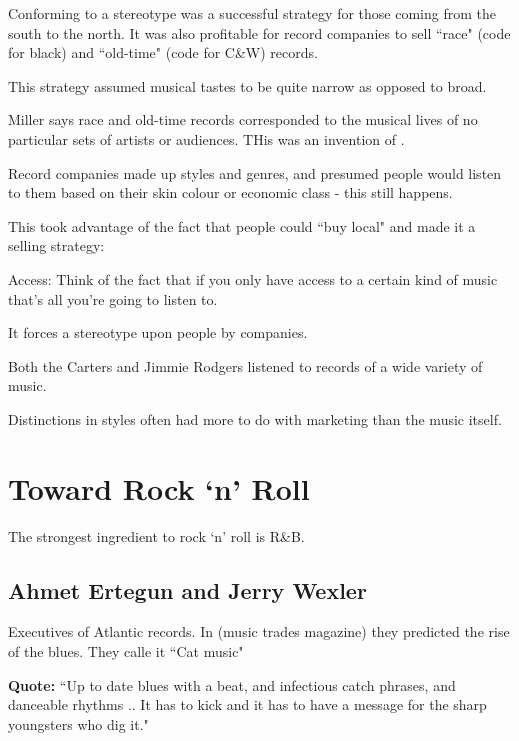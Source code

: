 \documentclass[12pt, a4paper, twoside, openright, titlepage]{book}
\begin{document}
Conforming to a stereotype was a successful strategy for those coming from the south to the north. It was also profitable for record companies to sell ``race" (code for black) and ``old-time" (code for C\&W) records.


This strategy assumed musical tastes to be quite narrow as opposed to broad.

\begin{note}{}{}
    Miller says race and old-time records corresponded to the musical lives of no particular sets of artists or audiences. THis was an invention of .
\end{note}

Record companies made up styles and genres, and presumed people would listen to them based on their skin colour or economic class - this still happens.


This took advantage of the fact that people could ``buy local" and made it a selling strategy:

\begin{note}{}{}
    Access: Think of the fact that if you only have access to a certain kind of music that's all you're going to listen to. 

    It forces a stereotype upon people by companies.
\end{note}

\begin{rmk}{}{}
    Both the Carters and Jimmie Rodgers listened to records of a wide variety of music.
\end{rmk}

Distinctions in styles often had more to do with marketing than the music itself.

\section{Toward Rock `n' Roll}

The strongest ingredient to rock `n' roll is R\&B.


\subsection{Ahmet Ertegun and Jerry Wexler}

Executives of Atlantic records. In  (music trades magazine) they predicted the rise of the blues. They calle it ``Cat music"

\textbf{Quote:} ``Up to date blues with a beat, and infectious catch phrases, and danceable rhythms .. It has to kick and it has to have a message for the sharp youngsters who dig it."
\end{document}
